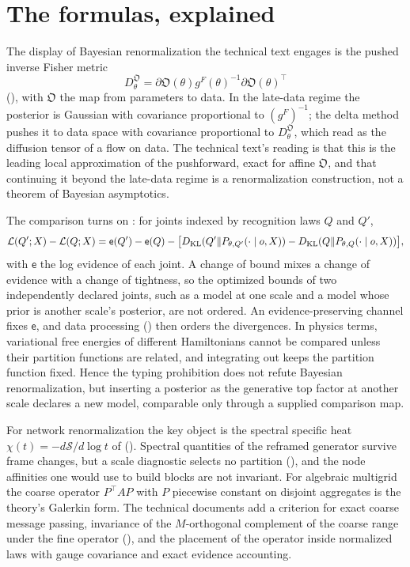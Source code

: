 \section{The formulas, explained}
\label{comp:ch15-formulas}

The display of Bayesian renormalization the technical text engages is the pushed inverse Fisher metric
\[
D^{\mathfrak O}_\theta=\partial\mathfrak O(\theta)g^F(\theta)^{-1}\partial\mathfrak O(\theta)^\top
\]
(), with $\mathfrak O$ the map from parameters to data. In the late-data regime
the posterior is Gaussian with covariance proportional to $(g^F)^{-1}$; the delta method pushes it to data
space with covariance proportional to $D^{\mathfrak O}_\theta$, which \citet{BermanKlingerStapleton2023}
read as the diffusion tensor of a flow on data. The technical text's reading is that this is the leading
local approximation of the pushforward, exact for affine $\mathfrak O$, and that continuing it beyond the
late-data regime is a renormalization construction, not a theorem of Bayesian asymptotics.

The comparison turns on : for joints indexed by recognition laws
$Q$ and $Q'$,
\[
\mathcal L(Q';X)-\mathcal L(Q;X)
=\mathsf e(Q')-\mathsf e(Q)
-\bigl[D_{\mathrm{KL}}(Q'\Vert P_{\theta,Q'}(\cdot\mid o,X))-D_{\mathrm{KL}}(Q\Vert P_{\theta,Q}(\cdot\mid o,X))\bigr],
\]
with $\mathsf e$ the log evidence of each joint. A change of bound mixes a change of evidence with a change
of tightness, so the optimized bounds of two independently declared joints, such as a model at one scale
and a model whose prior is another scale's posterior, are not ordered. An evidence-preserving channel fixes
$\mathsf e$, and data processing () then orders the divergences. In physics
terms, variational free energies of different Hamiltonians cannot be compared unless their partition
functions are related, and integrating out keeps the partition function fixed. Hence the typing
prohibition does not refute Bayesian renormalization, but inserting a posterior as the generative top
factor at another scale declares a new model, comparable only through a supplied comparison map.

For network renormalization the key object is the spectral specific heat
$\chi(t)=-d\mathcal S/d\log t$ of \citet{villegas2023laplacian} (). Spectral
quantities of the reframed generator survive frame changes, but a scale diagnostic selects no partition
(), and the node affinities one would use to build blocks are not invariant.
For algebraic multigrid the coarse operator $P^\top AP$ with $P$ piecewise constant on disjoint aggregates
\citep{Notay2010Aggregation} is the theory's Galerkin form. The technical documents add a criterion for
exact coarse message passing, invariance of the $M$-orthogonal complement of the coarse range under the
fine operator (), and the placement of the operator inside normalized
laws with gauge covariance and exact evidence accounting.


